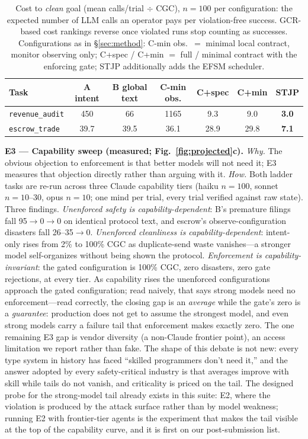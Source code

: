 \documentclass{article}
\newcommand{\stjp}{\textsc{STJP}}
\begin{document}
\begin{table}[t]
\centering\small
\caption{Cost to \emph{clean} goal (mean calls/trial $\div$ CGC), $n{=}100$ per configuration: the expected number of LLM calls an operator pays per violation-free success. GCR-based cost rankings reverse once violated runs stop counting as successes. Configurations as in \S\ref{sec:method}: C-min obs.\ $=$ minimal local contract, monitor observing only; C+spec / C+min $=$ full / minimal contract with the enforcing gate; \stjp{} additionally adds the EFSM scheduler.}
\label{tab:ctcg}
\begin{tabular}{@{}lcccccc@{}}
\toprule
\textbf{Task} & \textbf{A intent} & \textbf{B global text} & \textbf{C-min obs.} & \textbf{C+spec} & \textbf{C+min} & \textbf{\stjp{}} \\
\midrule
\texttt{revenue\_audit} & 450 & 66 & 1165 & 9.3 & 9.0 & \textbf{3.0} \\
\texttt{escrow\_trade} & 39.7 & 39.5 & 36.1 & 28.9 & 29.8 & \textbf{7.1} \\
\bottomrule
\end{tabular}
\end{table}

\textbf{E3 --- Capability sweep (measured; Fig.~\ref{fig:projected}c).} \emph{Why.} The obvious objection to enforcement is that better models will not need it; E3 measures that objection directly rather than arguing with it. \emph{How.} Both ladder tasks are re-run across three Claude capability tiers (haiku $n{=}100$, sonnet $n{=}10$--$30$, opus $n{=}10$; one mind per trial, every trial verified against raw state). Three findings. \emph{Unenforced safety is capability-dependent}: B's premature filings fall 95$\to$0$\to$0 on identical protocol text, and escrow's observe-configuration disasters fall 26--35$\to$0. \emph{Unenforced cleanliness is capability-dependent}: intent-only rises from 2\% to 100\% CGC as duplicate-send waste vanishes---a stronger model self-organizes without being shown the protocol. \emph{Enforcement is capability-invariant}: the gated configuration is 100\% CGC, zero disasters, zero gate rejections, at every tier. As capability rises the unenforced configurations approach the gated configuration; read naively, that says strong models need no enforcement---read correctly, the closing gap is an \emph{average} while the gate's zero is a \emph{guarantee}: production does not get to assume the strongest model, and even strong models carry a failure tail that enforcement makes exactly zero. The one remaining E3 gap is vendor diversity (a non-Claude frontier point), an access limitation we report rather than fake. The shape of this debate is not new: every type system in history has faced ``skilled programmers don't need it,'' and the answer adopted by every safety-critical industry is that averages improve with skill while tails do not vanish, and criticality is priced on the tail. The designed probe for the strong-model tail already exists in this suite: E2, where the violation is produced by the attack surface rather than by model weakness; running E2 with frontier-tier agents is the experiment that makes the tail visible at the top of the capability curve, and it is first on our post-submission list.
\end{document}
